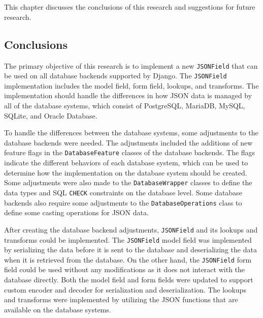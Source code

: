 \chapter{\kesimpulan}
This chapter discusses the conclusions of this research and suggestions for
future research.

\section{Conclusions}

The primary objective of this research is to implement a new \verb|JSONField|
that can be used on all database backends supported by Django. The
\verb|JSONField| implementation includes the model field, form field, lookups,
and transforms. The implementation should handle the differences in how JSON
data is managed by all of the database systems, which consist of PostgreSQL,
MariaDB, MySQL, SQLite, and Oracle Database.

To handle the differences between the database systems, some adjustments to the
database backends were needed. The adjustments included the additions of new
feature flags in the \verb|DatabaseFeature| classes of the database backends.
The flags indicate the different behaviors of each database system, which can
be used to determine how the implementation on the database system should be
created. Some adjustments were also made to the \verb|DatabaseWrapper| classes
to define the data types and SQL \verb|CHECK| constraints on the database
level. Some database backends also require some adjustments to the
\verb|DatabaseOperations| class to define some casting operations for JSON
data.

After creating the database backend adjustments, \verb|JSONField| and its
lookups and transforms could be implemented. The \verb|JSONField| model field
was implemented by serializing the data before it is sent to the database and
deserializing the data when it is retrieved from the database. On the other
hand, the \verb|JSONField| form field could be used without any modifications
as it does not interact with the database directly. Both the model field and
form fields were updated to support custom encoder and decoder for
serialization and deserialization. The lookups and transforms were implemented
by utilizing the JSON functions that are available on the database systems.

